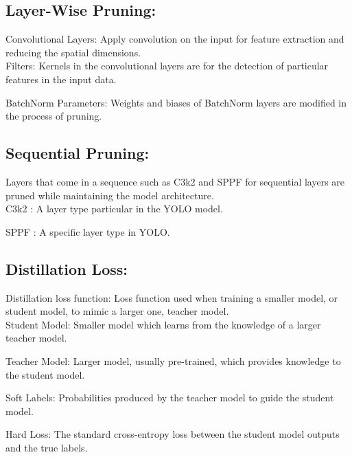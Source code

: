 \subsection{Layer-Wise Pruning:}

Convolutional Layers: Apply convolution on the input for feature extraction and reducing the spatial dimensions.\\

\noindent Filters: Kernels in the convolutional layers are for the detection of particular features in the input data.

\noindent BatchNorm Parameters: Weights and biases of BatchNorm layers are modified in the process of pruning.

\subsection{Sequential Pruning:}

Layers that come in a sequence such as C3k2 and SPPF for sequential layers are pruned while maintaining the model architecture.\\

\noindent C3k2 : A layer type particular in the YOLO model.

\noindent SPPF : A specific layer type in YOLO.

\subsection{Distillation Loss:}

Distillation loss function: Loss function used when training a smaller model, or student model, to mimic a larger one, teacher model.\\

\noindent Student Model: Smaller model which learns from the knowledge of a larger teacher model.

\noindent Teacher Model: Larger model, usually pre-trained, which provides knowledge to the student model.

\noindent Soft Labels: Probabilities produced by the teacher model to guide the student model.

\noindent Hard Loss: The standard cross-entropy loss between the student model outputs and the true labels.